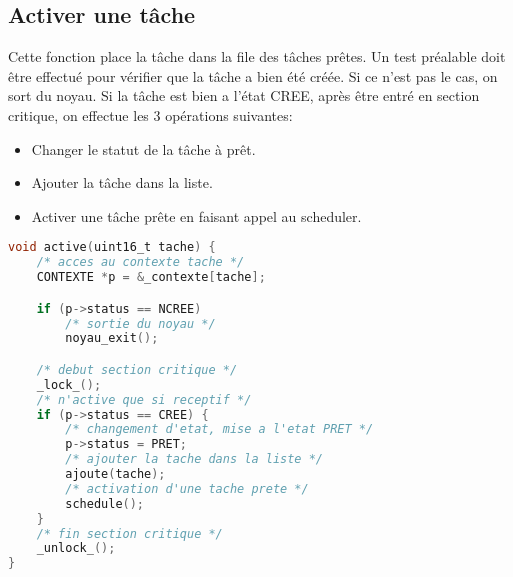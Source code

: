 \documentclass{article}
\begin{document}
\subsection{Activer une tâche}
Cette fonction place la tâche dans la file des tâches prêtes.
Un test préalable doit être effectué pour vérifier que la tâche a bien été créée. Si ce n'est pas le cas, on sort du noyau. Si la tâche est bien a l'état CREE, après être entré en section critique, on effectue les 3 opérations suivantes:
\begin{itemize}
    \item Changer le statut de la tâche à prêt.
    \item Ajouter la tâche dans la liste.
    \item Activer une tâche prête en faisant appel au scheduler.
\end{itemize}
\begin{lstlisting}[language=C, caption=noyau.c]
void active(uint16_t tache) {
    /* acces au contexte tache */
    CONTEXTE *p = &_contexte[tache];

    if (p->status == NCREE)
        /* sortie du noyau */
        noyau_exit();

    /* debut section critique */
    _lock_();
    /* n'active que si receptif */
    if (p->status == CREE) {
        /* changement d'etat, mise a l'etat PRET */
        p->status = PRET;
        /* ajouter la tache dans la liste */
        ajoute(tache);
        /* activation d'une tache prete */
        schedule();
    }
    /* fin section critique */
    _unlock_();
}
\end{lstlisting}
\end{document}
